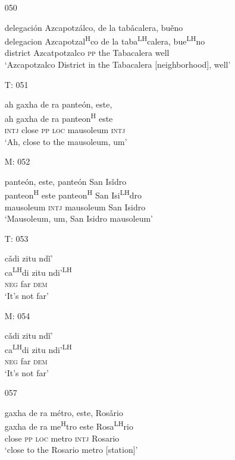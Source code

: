\begin{itemize}
\item[050]
 
\glll   delegaci\'{o}n Azcapotz\'{a}lco, de la tab\v{a}calera, bu\v{e}no\\
delegacion Azcapotzal\textsuperscript{H}co de la taba\textsuperscript{LH}calera, bue\textsuperscript{LH}no\\
district Azcatpotzalco \textsc{pp} the Tabacalera well\\
\glt `Azcapotzalco District in the Tabacalera [neighborhood], well'
 



\item[T: 051]
 
\glll   ah gaxha de ra pante\'{o}n, este, \\
ah gaxha de ra panteon\textsuperscript{H} este\\
\textsc{intj} close \textsc{pp} \textsc{loc} mausoleum \textsc{intj}\\
\glt `Ah, close to the mausoleum, um'
 

\item[M: 052]
 
\glll   pante\'{o}n, este, pante\'{o}n San Is\v{i}dro\\
panteon\textsuperscript{H} este panteon\textsuperscript{H} San Isi\textsuperscript{LH}dro\\
mausoleum \textsc{intj} mausoleum San Isidro\\
\glt `Mausoleum, um, San Isidro mausoleum'
 


\item[T: 053]
 
\glll   c\v{a}di zitu nd\v{i}'\\
ca\textsuperscript{LH}di zitu ndi'\textsuperscript{LH}\\
\textsc{neg} far \textsc{dem}\\
\glt `It's not far'
 


\item[M: 054]
 
\glll   c\v{a}di zitu nd\v{i}'\\
ca\textsuperscript{LH}di zitu ndi'\textsuperscript{LH}\\
\textsc{neg} far \textsc{dem}\\
\glt `It's not far'
 


\item[057]
 
\glll   gaxha de ra m\'{e}tro, este, Ros\v{a}rio\\
gaxha de ra me\textsuperscript{H}tro este Rosa\textsuperscript{LH}rio\\
close \textsc{pp} \textsc{loc} metro \textsc{intj} Rosario\\
\glt `close to the Rosario metro [station]' 
 


\end{itemize}
